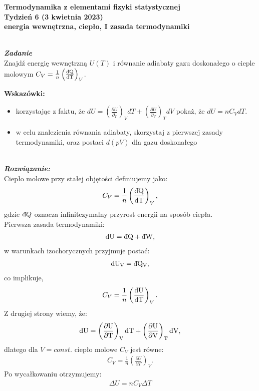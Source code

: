 \documentclass[11pt,a4paper]{article}
\newcounter{zadanie}\newcommand{\zadanie}[1][]{\addtocounter{zadanie}{1} ~\\  {\bf \emph{Zadanie \arabic{zadanie} #1 }} \\}
\newcounter{rozwiazanie}\newcommand{\rozwiazanie}[1][]{\addtocounter{rozwiazanie}{1} ~\\  {\bf \emph{Rozwiązanie: }} \\}
\newcommand{\dbar}{{\mkern3mu\mathchar'26\mkern-12mu d}}
\begin{document}

\begin{centering}
\bf{\Large{Termodynamika z elementami fizyki statystycznej}}\\
Tydzień 6  (3 kwietnia 2023)\\[3mm]
energia wewnętrzna, ciepło, I zasada termodynamiki \\ 
\end{centering} 
\vspace{5mm}

\zadanie

Znajdź energię wewnętrzną $U(T)$ i równanie adiabaty gazu doskonałego o cieple molowym
$C_V = \frac{1}{n}\left( \frac{\rm{\dbar}Q}{\rm{d}T}\right)_V$.

\textbf{Wskazówki:}
\begin{itemize}
  \item korzystając z faktu, że
    $dU = \left(\frac{\partial U}{\partial_T}\right)_V dT + \left(\frac{\partial U}{\partial_V}\right)_T dV$
    pokaż, że $dU = n C_V dT$.
  \item w celu znalezienia równania adiabaty, skorzystaj z pierwszej zasady termodynamiki,
    oraz postaci $d(pV)$ dla gazu doskonałego\\
\end{itemize}


\vspace{5mm}
\rozwiazanie
Ciepło molowe przy stałej objętości definiujemy jako:
\begin{align}
C_V = \frac{1}{n}\left( \frac{\rm{\dbar}Q}{\rm{d}T}\right)_V,
\end{align}
gdzie ${\rm \dbar} Q$ oznacza infinitezymalny przyrost energii na sposób ciepła. \\
Pierwsza zasada termodynamiki:
\begin{align}
\rm{d}U = \rm{\dbar}Q + \rm{\dbar}W,
\end{align}
w warunkach izochorycznych przyjmuje postać:
\begin{align}
\rm{d}U_V = \rm{\dbar}Q _V, 
\end{align}
co implikuje,
\begin{align}
C_V = \frac{1}{n}\left( \frac{\rm{d}U}{\rm{d}T}\right)_V.
\end{align}
Z drugiej strony wiemy, że:
\begin{align*}
\rm{d}U = \left(\frac{\partial U}{\partial T} \right)_V \rm{d}T +  \left(\frac{\partial U}{\partial V} \right)_T \rm{d}V,
\end{align*}
dlatego dla $V=const.$ ciepło molowe $C_V$ jest równe:
\begin{align}
C_V = \frac{1}{n}\left( \frac{\partial U}{\partial T} \right)_V.
\end{align}
Po wycałkowaniu otrzymujemy:
\begin{align}
\Delta U = n C_V \Delta T 
\end{align}
\end{document}
